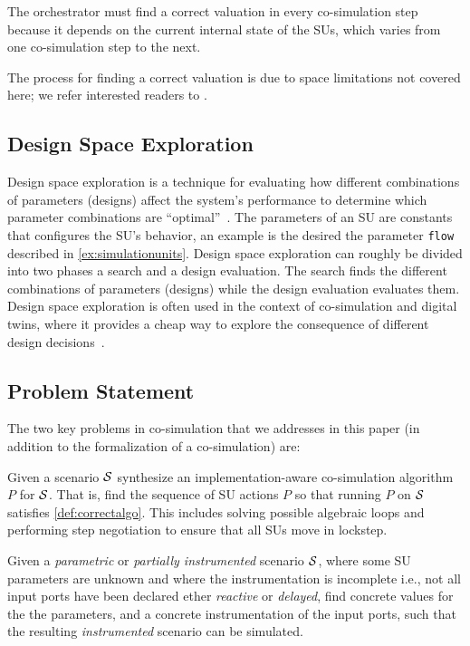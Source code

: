 The orchestrator must find a correct valuation in every co-simulation step because it depends on the current internal state of the SUs, which varies from one co-simulation step to the next.

The process for finding a correct valuation is due to space limitations not covered here; we refer interested readers to \cite{thrane2021,Kubler2000}.

\subsection{Design Space Exploration}
Design space exploration is a technique for evaluating how different combinations of parameters (designs) affect the system's performance to determine which parameter combinations are ``optimal''~\cite{kang_approach_2011}.
The parameters of an SU are constants that configures the SU's behavior, an example is the desired the parameter \texttt{flow} described in \cref{ex:simulationunits}.
Design space exploration can roughly be divided into two phases a search and a design evaluation.
The search finds the different combinations of parameters (designs) while the design evaluation evaluates them.
Design space exploration is often used in the context of co-simulation and digital twins, where it provides a cheap way to explore the consequence of different design decisions~\cite{gamble_design_2014,dse}.


\subsection{Problem Statement}
The two key problems in co-simulation that we addresses in this paper (in addition to the formalization of a co-simulation) are:
\begin{compactenum}
  \item Given a scenario $\mathcal{S}$ synthesize an implementation-aware co-simulation algorithm $P$ for $\mathcal{S}$.
  That is, find the sequence of SU actions $P$ so that running $P$ on $\mathcal{S}$ satisfies \cref{def:correctalgo}.
  This includes solving possible algebraic loops and performing step negotiation to ensure that all SUs move in lockstep.
  \item Given a \emph{parametric} or \emph{partially instrumented} scenario $\mathcal{S}$, where some SU parameters are unknown and where the instrumentation is incomplete i.e., not all input ports have been declared ether \emph{reactive} or \emph{delayed}, find concrete values for the the parameters, and a concrete instrumentation of the input ports, such that the resulting \emph{instrumented} scenario can be simulated.
\end{compactenum}
